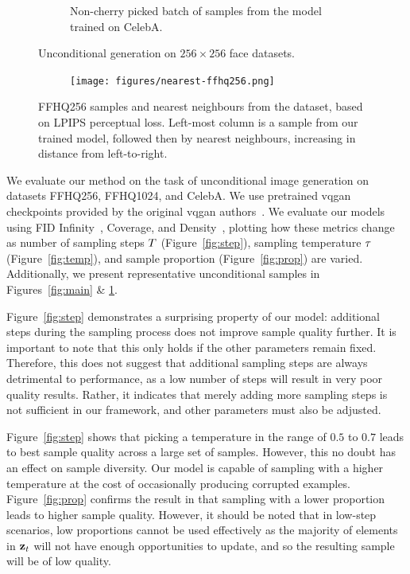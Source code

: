 \begin{figure}[ht]
\begin{subfigure}[b]{0.47\textwidth}
        \caption{
            Non-cherry picked batch of samples from the model trained on CelebA.
        }
    \end{subfigure}
    \caption{Unconditional generation on $256 \times 256$ face datasets.}
    \label{fig:face}
\end{figure}

\begin{figure}[ht]
    \centering
    \begin{subfigure}[b]{\textwidth}
        \centering
        \texttt{[image: figures/nearest-ffhq256.png]}
    \end{subfigure}
    \caption{
        FFHQ256 samples and nearest neighbours from the dataset, based on LPIPS
        perceptual loss. Left-most column is a sample from our trained
        model, followed then by nearest neighbours, increasing in distance
        from left-to-right.
    }
\end{figure}

We evaluate our method on the task of unconditional image generation on datasets
FFHQ256, FFHQ1024, and CelebA. We use pretrained \gls{vqgan} checkpoints
provided by the original \gls{vqgan} authors~\cite{esser2021taming}. We evaluate
our models using FID Infinity~\cite{chong2020effectively}, Coverage, and
Density~\cite{ferjad2020icml}, plotting how these metrics change as number of
sampling steps $T$ (Figure~\ref{fig:step}), sampling temperature
$\tau$ (Figure~\ref{fig:temp}), and sample proportion
(Figure~\ref{fig:prop}) are varied. Additionally, we present representative
unconditional samples in Figures~\ref{fig:main} \& \ref{fig:face}.

Figure~\ref{fig:step} demonstrates a surprising property of our model:
additional steps during the sampling process does not improve sample quality
further. It is important to note that this only holds if the other parameters
remain fixed. Therefore, this does not suggest that additional sampling steps
are always detrimental to performance, as a low number of steps will result in
very poor quality results. Rather, it indicates that merely adding more sampling
steps is not sufficient in our framework, and other parameters must also be
adjusted.

Figure~\ref{fig:step} shows that picking a temperature in the range of $0.5$ to
$0.7$ leads to best sample quality across a large set of samples. However, this
no doubt has an effect on sample diversity. Our model is capable of sampling
with a higher temperature at the cost of occasionally producing corrupted
examples. Figure~\ref{fig:prop} confirms the result in
\citet{savinov2022stepunrolled} that sampling with a lower proportion leads to
higher sample quality. However, it should be noted that in low-step scenarios,
low proportions cannot be used effectively as the majority of elements in
$\mathbf{z}_t$ will not have enough opportunities to update, and so the resulting
sample will be of low quality.

